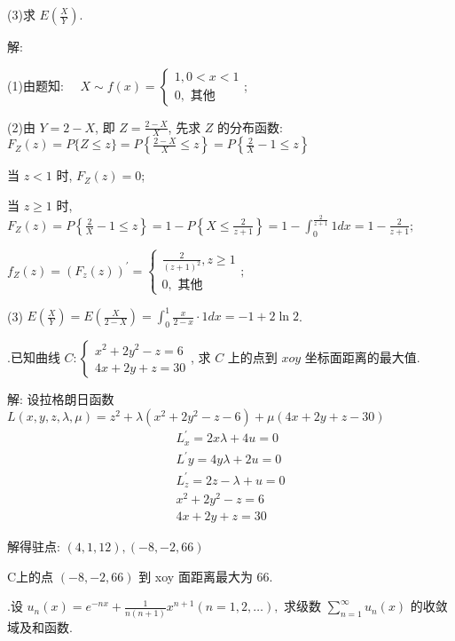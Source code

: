 \documentclass{article}
\begin{document}
(3)求 $E\left(\frac{X}{Y}\right)$.

解:

(1)由题知: $\quad X \sim f(x)=\left\{\begin{array}{c}1,0<x<1 \\ 0, \text { 其他 }\end{array}\right.$;

(2)由 $Y=2-X$, 即 $Z=\frac{2-X}{X}$, 先求 $Z$ 的分布函数:
$F_{Z}(z)=P\{Z \leq z\}=P\left\{\frac{2-X}{X} \leq z\right\}=P\left\{\frac{2}{X}-1 \leq z\right\}$

当 $z<1$ 时, $F_{Z}(z)=0$;

当 $z \geq 1$ 时, $F_{Z}(z)=P\left\{\frac{2}{X}-1 \leq z\right\}=1-P\left\{X \leq \frac{2}{z+1}\right\}=1-\int_{0}^{\frac{2}{z+1}} 1 d x=1-\frac{2}{z+1} ;$

$f_{Z}(z)=\left(F_{z}(z)\right)^{\prime}=\left\{\begin{array}{c}\frac{2}{(z+1)^{2}}, z \geq 1 \\ 0, \text { 其他 }\end{array} ;\right.$

(3) $E\left(\frac{X}{Y}\right)=E\left(\frac{X}{2-X}\right)=\int_{0}^{1} \frac{x}{2-x} \cdot 1 d x=-1+2 \ln 2$.

\vspace{1ex}
{.}已知曲线 $C:\left\{\begin{array}{l}x^{2}+2 y^{2}-z=6 \\ 4 x+2 y+z=30\end{array}\right.$, 求 $C$ 上的点到 $x o y$ 坐标面距离的最大值.

解: 设拉格朗日函数 $L(x, y, z, \lambda, \mu)=z^{2}+\lambda\left(x^{2}+2 y^{2}-z-6\right)+\mu(4 x+2 y+z-30)$
$$
    \begin{array}{l}
        L_{x}^{\prime}=2 x \lambda+4 u=0 \\
        L^{\prime} y=4 y \lambda+2 u=0   \\
        L_{z}^{\prime}=2 z-\lambda+u=0   \\
        x^{2}+2 y^{2}-z=6                \\
        4 x+2 y+z=30
    \end{array}
$$

解得驻点: $(4,1,12),(-8,-2,66)$

C上的点 $(-8,-2,66)$ 到 xoy 面距离最大为 $66$.

\vspace{1ex}
{.}设 $u_{n}(x)=e^{-n x}+\frac{1}{n(n+1)} x^{n+1}(n=1,2, \ldots), \text { 求级数 } \sum_{n=1}^{\infty} u_{n}(x) $ 的收敛域及和函数.
\end{document}
